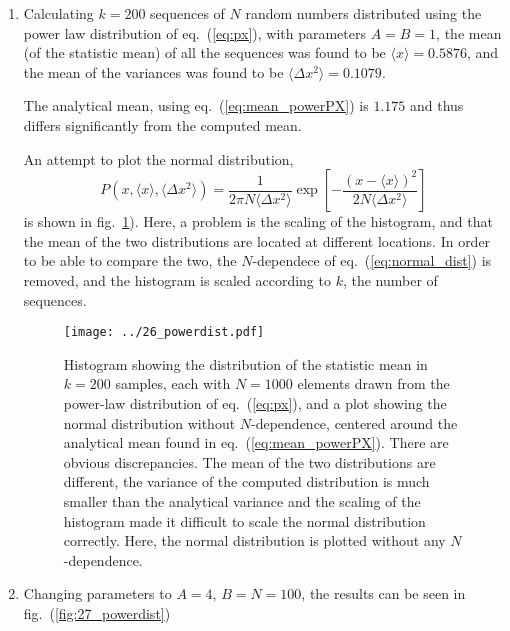 \documentclass[a4paper,11pt]{article}
\begin{document}
\begin{enumerate}
    \item Calculating $k = 200$ sequences of $N$ random numbers distributed using the power law distribution of eq.~(\ref{eq:px}), with parameters $A= B= 1$, the mean (of the statistic mean) of all the sequences was found to be $\langle x \rangle = 0.5876$, and the mean of the variances was found to be $\langle \Delta x^2 \rangle = 0.1079$.

        The analytical mean, using eq.~(\ref{eq:mean_powerPX}) is $1.175$ and thus differs significantly from the computed mean.

        An attempt to plot the normal distribution,
        \begin{equation}
            P(x,\langle x \rangle, \langle \Delta x^2 \rangle) = \frac{1}{2 \pi N \langle \Delta x^2 \rangle} \exp \left[ - \frac{\left( x - \langle x \rangle \right)^2}{2 N \langle \Delta x^2 \rangle} \right]
            \label{eq:normal_dist}
        \end{equation}
        is shown in fig.~\ref{fig:26_powerdist}). Here, a problem is the scaling of the histogram, and that the mean of the two distributions are located at different locations. In order to be able to compare the two, the $N$-dependece of eq.~(\ref{eq:normal_dist}) is removed, and the histogram is scaled according to $k$, the number of sequences.

        \begin{figure}[htb]
            \centering
            \texttt{[image: ../26\_powerdist.pdf]}
            \caption{Histogram showing the distribution of the statistic mean in $k=200$ samples, each with $N=1000$ elements drawn from the power-law distribution of eq.~(\ref{eq:px}), and a plot showing the normal distribution without $N$-dependence, centered around the analytical mean found in eq.~(\ref{eq:mean_powerPX}). There are obvious discrepancies. The mean of the two distributions are different, the variance of the computed distribution is much smaller than the analytical variance and the scaling of the histogram made it difficult to scale the normal distribution correctly. Here, the normal distribution is plotted without any $N$-dependence. }
            \label{fig:26_powerdist}
        \end{figure}

    \item Changing parameters to $A = 4$, $B = N = 100$, the results can be seen in fig.~(\ref{fig:27_powerdist})



\end{enumerate}
\end{document}
